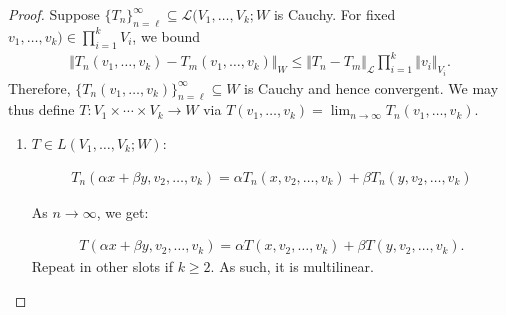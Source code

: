 \documentclass{report}
\begin{document}
\begin{proof}
    Suppose $\{T_n\}^\infty_{n = \ell} \subseteq \mathcal L(V_1, \ldots, V_k ; W$ is Cauchy. For fixed $v_1, \ldots, v_k) \in \prod_{i=1}^k V_i$, we bound
    \begin{align*}
        \Vert T_n(v_1, \ldots, v_k) - T_m(v_1, \ldots, v_k)\Vert_W \leq \Vert T_n - T_m \Vert_{\mathcal L}\prod_{i=1}^k \Vert v_i \Vert_{V_i}.
    \end{align*}
    Therefore, $\{T_n(v_1, \ldots, v_k)\}^\infty_{n = \ell} \subseteq  W$ is Cauchy and hence convergent. We may thus define $T: V_1 \times \cdots \times V_k \to W$ via $T(v_1, \ldots, v_k) = \lim_{n \to \infty} T_n(v_1, \ldots, v_k)$.
    \begin{enumerate}
        \item $T \in L(V_1, \ldots, V_k; W)$:
        
        \begin{align*}
            T_n(\alpha x  + \beta y, v_2,\ldots, v_k) = \alpha T_n(x, v_2, \ldots, v_k) + \beta T_n(y, v_2, \ldots, v_k)
        \end{align*}
        

        As $n \to \infty$, we get:

        \begin{align*}
            T(\alpha x + \beta y, v_2, \ldots, v_k) = \alpha T(x, v_2, \ldots, v_k) + \beta T(y, v_2, \ldots, v_k).
        \end{align*}
        Repeat in other slots if $k \geq 2$. As such, it is multilinear.


\end{enumerate}
\end{proof}
\end{document}
